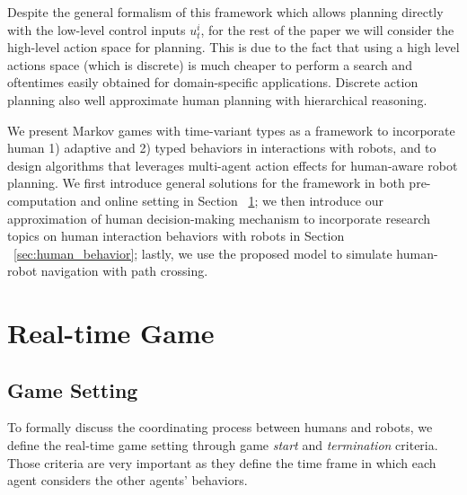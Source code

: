 \documentclass[letterpaper, 10 pt, conference]{ieeeconf}  %
\begin{document}
Despite the general formalism of this framework which allows planning directly 
with the low-level control inputs $u^i_t$, 
for the rest of the paper we will consider the high-level action space for planning. This is due to the fact that using a high level actions space (which is discrete) is much cheaper to perform a search and oftentimes easily obtained for domain-specific applications. Discrete action planning also well approximate human planning with hierarchical reasoning.  

We present Markov games with time-variant types as a framework to incorporate 
human 1) adaptive and 2) typed behaviors in interactions with robots, and to 
design algorithms that leverages multi-agent action effects for 
human-aware robot planning.   
We first introduce general solutions for the framework in both 
pre-computation and online setting in Section ~\ref{sec:realtime_game}; we 
then introduce our approximation of human decision-making mechanism to 
incorporate research topics on human interaction behaviors with robots in 
Section ~\ref{sec:human_behavior}; lastly, we use the proposed model to 
simulate human-robot navigation with path crossing.

\vspace{-.3em}
\section{Real-time Game}\label{sec:realtime_game}
\vspace{-.2em}
\subsection{Game Setting}
To formally discuss the coordinating process between humans and robots, we 
define the real-time game setting through game \textit{start} and \textit{termination} criteria. Those criteria are very important as they define the time frame in which each agent considers the other agents' behaviors.
\end{document}
